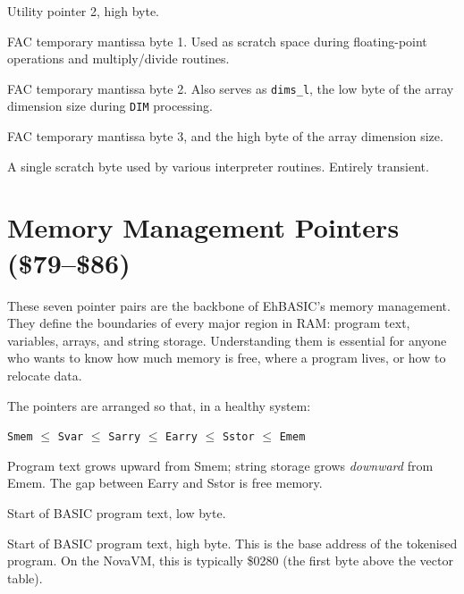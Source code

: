 Utility pointer 2, high byte.


FAC temporary mantissa byte 1.  Used as scratch space during floating-point
operations and multiply/divide routines.


FAC temporary mantissa byte 2.  Also serves as \texttt{dims\_l}, the low byte
of the array dimension size during \texttt{DIM} processing.


FAC temporary mantissa byte 3, and the high byte of the array dimension size.


A single scratch byte used by various interpreter routines.  Entirely
transient.

\section{Memory Management Pointers (\$79--\$86)}

These seven pointer pairs are the backbone of EhBASIC's memory management.
They define the boundaries of every major region in RAM: program text,
variables, arrays, and string storage.  Understanding them is essential for
anyone who wants to know how much memory is free, where a program lives, or
how to relocate data.

The pointers are arranged so that, in a healthy system:

\begin{center}
\texttt{Smem} $\leq$ \texttt{Svar} $\leq$ \texttt{Sarry} $\leq$
\texttt{Earry} $\leq$ \texttt{Sstor} $\leq$ \texttt{Emem}
\end{center}

Program text grows upward from Smem; string storage grows \emph{downward} from
Emem.  The gap between Earry and Sstor is free memory.


Start of BASIC program text, low byte.


Start of BASIC program text, high byte.  This is the base address of the
tokenised program.  On the NovaVM, this is typically \$0280 (the first byte
above the vector table).

